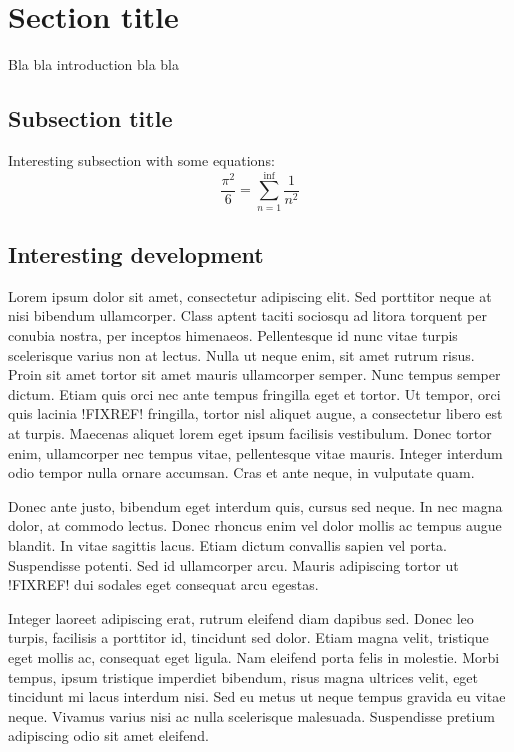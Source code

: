 \section{Section title}

Bla bla introduction bla bla

\subsection{Subsection title}

Interesting subsection with some equations:
\begin{equation*}
  \frac{\pi^{2}}{6} = \sum_{n=1}^{\inf} \frac{1}{n^{2}}
\end{equation*}


\subsection{Interesting development}



Lorem ipsum dolor sit amet, consectetur adipiscing elit. Sed porttitor
neque at nisi bibendum ullamcorper. Class aptent taciti sociosqu ad
litora torquent per conubia nostra, per inceptos
himenaeos. Pellentesque id nunc vitae turpis scelerisque varius non at
lectus. Nulla ut neque enim, sit amet rutrum risus. Proin sit amet
tortor sit amet mauris ullamcorper semper. Nunc tempus semper
dictum. Etiam quis orci nec ante tempus fringilla eget et tortor. Ut
tempor, orci quis lacinia !FIXREF! fringilla, tortor nisl aliquet
augue, a consectetur libero est at turpis. Maecenas aliquet lorem eget
ipsum facilisis vestibulum. Donec tortor enim, ullamcorper nec tempus
vitae, pellentesque vitae mauris. Integer interdum odio tempor nulla
ornare accumsan. Cras et ante neque, in vulputate quam.

Donec ante justo, bibendum eget interdum quis, cursus sed neque. In
nec magna dolor, at commodo lectus. Donec rhoncus enim vel dolor
mollis ac tempus augue blandit. In vitae sagittis lacus. Etiam dictum
convallis sapien vel porta. Suspendisse potenti. Sed id ullamcorper
arcu. Mauris adipiscing tortor ut !FIXREF!  dui sodales eget consequat
arcu egestas.

Integer laoreet adipiscing erat, rutrum eleifend diam dapibus
sed. Donec leo turpis, facilisis a porttitor id, tincidunt sed
dolor. Etiam magna velit, tristique eget mollis ac, consequat eget
ligula. Nam eleifend porta felis in molestie. Morbi tempus, ipsum
tristique imperdiet bibendum, risus magna ultrices velit, eget
tincidunt mi lacus interdum nisi. Sed eu metus ut neque tempus gravida
eu vitae neque. Vivamus varius nisi ac nulla scelerisque
malesuada. Suspendisse pretium adipiscing odio sit amet eleifend.


